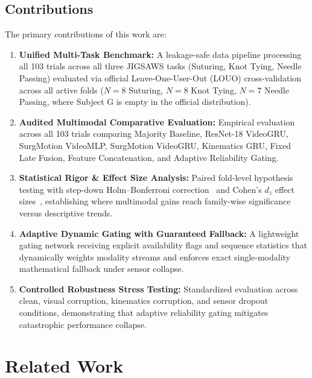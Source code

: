 \documentclass[10pt,journal]{IEEEtran}
\begin{document}
\subsection{Contributions}
The primary contributions of this work are:
\begin{enumerate}
    \item \textbf{Unified Multi-Task Benchmark:} A leakage-safe data pipeline processing all 103 trials across all three JIGSAWS tasks (Suturing, Knot Tying, Needle Passing) evaluated via official Leave-One-User-Out (LOUO) cross-validation across all active folds ($N=8$ Suturing, $N=8$ Knot Tying, $N=7$ Needle Passing, where Subject G is empty in the official distribution).
    \item \textbf{Audited Multimodal Comparative Evaluation:} Empirical evaluation across all 103 trials comparing Majority Baseline, ResNet-18 VideoGRU, SurgMotion VideoMLP, SurgMotion VideoGRU, Kinematics GRU, Fixed Late Fusion, Feature Concatenation, and Adaptive Reliability Gating.
    \item \textbf{Statistical Rigor \& Effect Size Analysis:} Paired fold-level hypothesis testing with step-down Holm--Bonferroni correction~\cite{holm1979simple} and Cohen's $d_z$ effect sizes~\cite{cohen1988statistical}, establishing where multimodal gains reach family-wise significance versus descriptive trends.
    \item \textbf{Adaptive Dynamic Gating with Guaranteed Fallback:} A lightweight gating network receiving explicit availability flags and sequence statistics that dynamically weights modality streams and enforces exact single-modality mathematical fallback under sensor collapse.
    \item \textbf{Controlled Robustness Stress Testing:} Standardized evaluation across clean, visual corruption, kinematics corruption, and sensor dropout conditions, demonstrating that adaptive reliability gating mitigates catastrophic performance collapse.
\end{enumerate}

\section{Related Work}
\end{document}
